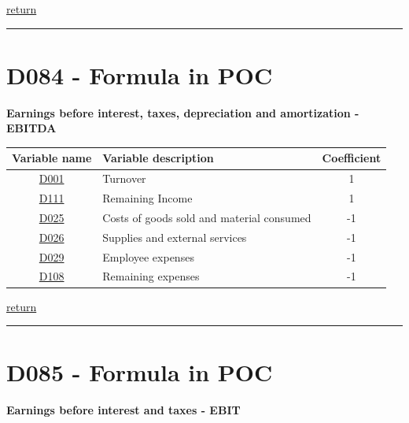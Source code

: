 \documentclass[]{book}
\begin{document}
\protect\hyperlink{b3.-profit-and-loss-statement-variables}{return}

\begin{center}\rule{0.5\linewidth}{\linethickness}\end{center}

\hypertarget{d084---formula-in-poc}{%
\section{D084 - Formula in POC}\label{d084---formula-in-poc}}

\textbf{Earnings before interest, taxes, depreciation and amortization - EBITDA}

\begin{longtable}[]{@{}clc@{}}
\toprule
Variable name & Variable description & Coefficient\tabularnewline
\midrule
\endhead
\protect\hyperlink{d001---formula-in-poc}{D001} & Turnover & 1\tabularnewline
\protect\hyperlink{d111---formula-in-poc}{D111} & Remaining Income & 1\tabularnewline
\protect\hyperlink{d025---formula-in-poc}{D025} & Costs of goods sold and material consumed & -1\tabularnewline
\protect\hyperlink{d026---formula-in-poc}{D026} & Supplies and external services & -1\tabularnewline
\protect\hyperlink{d029---formula-in-poc}{D029} & Employee expenses & -1\tabularnewline
\protect\hyperlink{d108---formula-in-poc}{D108} & Remaining expenses & -1\tabularnewline
\bottomrule
\end{longtable}

\protect\hyperlink{b3.-profit-and-loss-statement-variables}{return}

\begin{center}\rule{0.5\linewidth}{\linethickness}\end{center}

\hypertarget{d085---formula-in-poc}{%
\section{D085 - Formula in POC}\label{d085---formula-in-poc}}

\textbf{Earnings before interest and taxes - EBIT}
\end{document}
